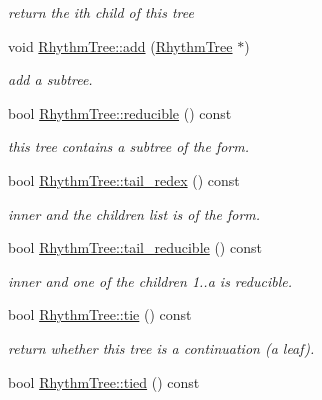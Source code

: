 \begin{DoxyCompactItemize}
\begin{DoxyCompactList}\small\item\em return the ith child of this tree \end{DoxyCompactList}\item 
void \mbox{\hyperlink{group__output_ga5749469b3ff6ec88fcab75961e7d278c}{Rhythm\+Tree\+::add}} (\mbox{\hyperlink{classRhythmTree}{Rhythm\+Tree}} $\ast$)
\begin{DoxyCompactList}\small\item\em add a subtree. \end{DoxyCompactList}\item 
bool \mbox{\hyperlink{group__output_gafdda5b1a3c16c8e64337c26bcdb368e9}{Rhythm\+Tree\+::reducible}} () const
\begin{DoxyCompactList}\small\item\em this tree contains a subtree of the form. \end{DoxyCompactList}\item 
bool \mbox{\hyperlink{group__output_gaf723874e871dc01efb036ccbac07c32b}{Rhythm\+Tree\+::tail\+\_\+redex}} () const
\begin{DoxyCompactList}\small\item\em inner and the children list is of the form. \end{DoxyCompactList}\item 
\mbox{\label{group__output_ga799761965ae00bb24e16ebb98f66995a}} 
bool \mbox{\hyperlink{group__output_ga799761965ae00bb24e16ebb98f66995a}{Rhythm\+Tree\+::tail\+\_\+reducible}} () const
\begin{DoxyCompactList}\small\item\em inner and one of the children 1..a is reducible. \end{DoxyCompactList}\item 
\mbox{\label{group__output_ga3933e83072d4e7c3bb3d19d25df90b47}} 
bool \mbox{\hyperlink{group__output_ga3933e83072d4e7c3bb3d19d25df90b47}{Rhythm\+Tree\+::tie}} () const
\begin{DoxyCompactList}\small\item\em return whether this tree is a continuation (a leaf). \end{DoxyCompactList}\item 
\mbox{\label{group__output_gacd73e0032e3dd22320819c4cda3d60a4}} 
bool \mbox{\hyperlink{group__output_gacd73e0032e3dd22320819c4cda3d60a4}{Rhythm\+Tree\+::tied}} () const

\end{DoxyCompactItemize}
